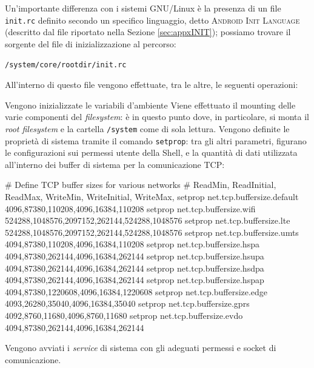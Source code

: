 Un'importante differenza con i sistemi GNU/Linux è la presenza di un file
\texttt{\small init.rc} definito secondo un specifico linguaggio, detto \textsc{Android Init Language}
(descritto dal file riportato nella Sezione \vref{sec:appxINIT});
possiamo trovare il sorgente del file di inizializzazione al percorso:
\begin{center}
\AOSP\texttt{\small/system/core/rootdir/init.rc}
\end{center}
All'interno di questo file vengono effettuate, tra le altre, le seguenti operazioni:
\begin{itemize}
\diam Vengono inizializzate le variabili d'ambiente
\diam Viene effettuato il mounting delle varie componenti del \textit{filesystem}: è in questo punto dove, in particolare, si monta il \textit{root filesystem} e la cartella \texttt{\small /system} come di sola lettura.
\diam Vengono definite le proprietà di sistema tramite il comando \texttt{setprop}: tra gli altri parametri, figurano le configurazioni sui permessi utente della Shell, e la quantità di dati utilizzata all'interno dei buffer di sistema per la comunicazione TCP:
\begin{bash}
# Define TCP buffer sizes for various networks
#   ReadMin, ReadInitial, ReadMax, WriteMin, WriteInitial, WriteMax,
    setprop net.tcp.buffersize.default 4096,87380,110208,4096,16384,110208
    setprop net.tcp.buffersize.wifi    524288,1048576,2097152,262144,524288,1048576
    setprop net.tcp.buffersize.lte     524288,1048576,2097152,262144,524288,1048576
    setprop net.tcp.buffersize.umts    4094,87380,110208,4096,16384,110208
    setprop net.tcp.buffersize.hspa    4094,87380,262144,4096,16384,262144
    setprop net.tcp.buffersize.hsupa   4094,87380,262144,4096,16384,262144
    setprop net.tcp.buffersize.hsdpa   4094,87380,262144,4096,16384,262144
    setprop net.tcp.buffersize.hspap   4094,87380,1220608,4096,16384,1220608
    setprop net.tcp.buffersize.edge    4093,26280,35040,4096,16384,35040
    setprop net.tcp.buffersize.gprs    4092,8760,11680,4096,8760,11680
    setprop net.tcp.buffersize.evdo    4094,87380,262144,4096,16384,262144
\end{bash}
\diam Vengono avviati i \textit{service} di sistema con gli adeguati permessi e socket di comunicazione.
\end{itemize}


